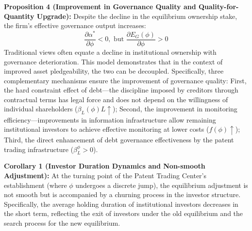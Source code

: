 \documentclass[12pt,a4paper]{article}
\begin{document}
\textbf{Proposition 4 (Improvement in Governance Quality and Quality-for-Quantity Upgrade):} Despite the decline in the equilibrium ownership stake, the firm's effective governance output increases:
\begin{equation}
\frac{\partial \alpha^*}{\partial \phi} < 0, \text{ but } \frac{\partial E_G(\phi)}{\partial \phi} > 0
\end{equation}
Traditional views often equate a decline in institutional ownership with governance deterioration. This model demonstrates that in the context of improved asset pledgeability, the two can be decoupled. Specifically, three complementary mechanisms ensure the improvement of governance quality: First, the hard constraint effect of debt---the discipline imposed by creditors through contractual terms has legal force and does not depend on the willingness of individual shareholders ($\beta_L(\phi) L \uparrow$); Second, the improvement in monitoring efficiency---improvements in information infrastructure allow remaining institutional investors to achieve effective monitoring at lower costs ($f(\phi) \uparrow$); Third, the direct enhancement of debt governance effectiveness by the patent trading infrastructure ($\beta_L^\phi > 0$).

\textbf{Corollary 1 (Investor Duration Dynamics and Non-smooth Adjustment):} At the turning point of the Patent Trading Center's establishment (where $\phi$ undergoes a discrete jump), the equilibrium adjustment is not smooth but is accompanied by a churning process in the investor structure. Specifically, the average holding duration of institutional investors decreases in the short term, reflecting the exit of investors under the old equilibrium and the search process for the new equilibrium.
\end{document}
